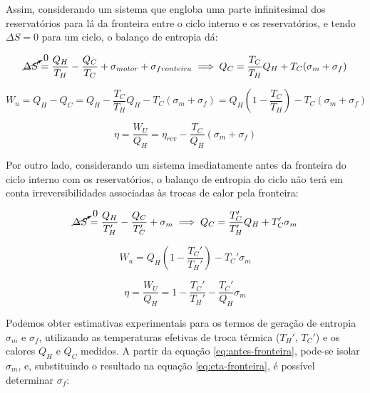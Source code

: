 Assim, considerando um sistema que engloba uma parte infinitesimal dos reservatórios para lá da fronteira entre o ciclo interno e os reservatórios, e tendo $\Delta S = 0$ para um ciclo, o balanço de entropia dá:

\begin{equation*}
    \cancelto{0}{\Delta S} = \frac{Q_H}{T_H} - \frac{Q_C}{T_C} + \sigma_{motor} + \sigma_{fronteira} \implies Q_C = \frac{T_C}{T_H} Q_H + T_C (\sigma_m +\sigma_f)
\end{equation*}

\begin{equation*}
    W_u = Q_H - Q_C = Q_H - \frac{T_C}{T_H} Q_H - T_C (\sigma_m +\sigma_f) = Q_H \left(1 - \frac{T_C}{T_H} \right) - T_C(\sigma_m +\sigma_f)
\end{equation*}

\begin{equation} \label{eq:eta-fronteira}
    \eta = \frac{W_U}{Q_H} = \eta_{rev} - \frac{T_C}{Q_H}(\sigma_m +\sigma_f)
\end{equation}

Por outro lado, considerando um sistema imediatamente antes da fronteira do ciclo interno com os reservatórios, o balanço de entropia do ciclo não terá em conta irreversibilidades associadas às trocas de calor pela fronteira:

\begin{equation*}
    \cancelto{0}{\Delta S} = \frac{Q_H}{T_H'} - \frac{Q_C}{T_C'} + \sigma_{m} \implies Q_C = \frac{T_C'}{T_H'} Q_H + T_C' \sigma_m
\end{equation*}

\begin{equation*}
    W_u = Q_H \left(1 - \frac{T_C'}{T_H'} \right) - T_C' \sigma_m
\end{equation*}

\begin{equation} \label{eq:antes-fronteira}
    \eta = \frac{W_U}{Q_H} = 1 - \frac{T_C'}{T_H'} - \frac{T_C'}{Q_H} \sigma_m
\end{equation}

Podemos obter estimativas experimentais para os termos de geração de entropia \( \sigma_m \) e \( \sigma_f \), utilizando as temperaturas efetivas de troca térmica (\( T_H' \), \( T_C' \)) e os calores \( Q_H \) e \( Q_C \) medidos. A partir da equação \ref{eq:antes-fronteira}, pode-se isolar \( \sigma_m \), e, substituindo o resultado na equação \ref{eq:eta-fronteira}, é possível determinar \( \sigma_f \):


